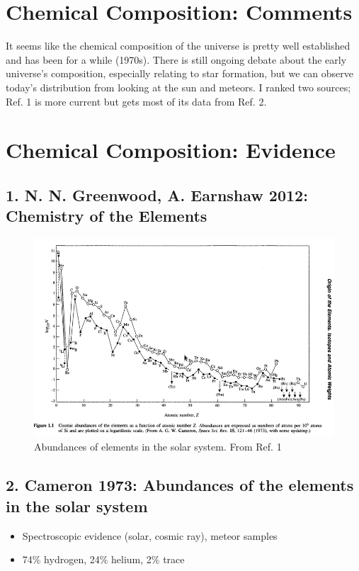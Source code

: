 \documentclass{article}
\begin{document}
\newpage
\section{Chemical Composition: Comments}
It seems like the chemical composition of the universe is pretty well established and has been for a while (1970s). There is still ongoing debate about the early universe's composition, especially relating to star formation, but we can observe today's distribution from looking at the sun and meteors. I ranked two sources; Ref. 1 is more current but gets most of its data from Ref. 2. 

\newpage
\section*{Chemical Composition: Evidence}
\subsection*{1. N. N. Greenwood, A. Earnshaw 2012: Chemistry of the Elements}

\begin{figure}[h]
\begin{center}
\includegraphics[width=.8\textwidth,angle=0.]{abundances.png}
\end{center}
\caption{Abundances of elements in the solar system. From Ref. 1}
\end{figure}

\subsection*{2. Cameron 1973: Abundances of the elements in the solar system}
\begin{itemize}
\item Spectroscopic evidence (solar, cosmic ray), meteor samples
\item 74\% hydrogen, 24\% helium, 2\% trace
\end{itemize}
\end{document}
